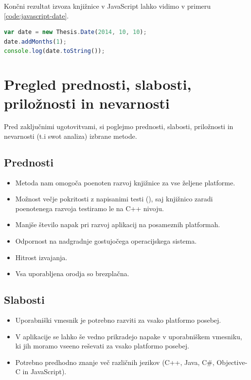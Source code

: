 Končni rezultat izvoza knjižnice v JavaScript lahko vidimo v primeru \ref{code:javascript-date}.

\begin{lstlisting}[caption={Primer uporabe izvoženega razreda \texttt{Date} v JavaScript.}, label=code:javascript-date, language=JavaScript]
var date = new Thesis.Date(2014, 10, 10);
date.addMonths(1);
console.log(date.toString());
\end{lstlisting}

\section{Pregled prednosti, slabosti, priložnosti in nevarnosti}

Pred zaključnimi ugotovitvami, si poglejmo prednosti, slabosti, priložnosti in nevarnosti (t.i \gls{swot} analiza) izbrane metode.


\subsection{Prednosti}

\begin{itemize}
  \item Metoda nam omogoča poenoten razvoj knjižnice za vse željene platforme.
  \item Možnost večje pokritosti z napisanimi testi (), saj knjižnico zaradi poenotenega razvoja testiramo le na C++ nivoju.
  \item Manjše število napak pri razvoj aplikacij na posameznih platformah.
  \item Odpornost na nadgradnje gostujočega operacijskega sistema.
  \item Hitrost izvajanja.
  \item Vsa uporabljena orodja so brezplačna.
\end{itemize}

\subsection{Slabosti}

\begin{itemize}
  \item Uporabniški vmesnik je potrebno razviti za vsako platformo posebej.
  \item V aplikacije se lahko še vedno prikradejo napake v uporabniškem vmesniku, ki jih moramo vseeno reševati za vsako platformo posebej.
  \item Potrebno predhodno znanje več različnih jezikov (C++, Java, C\#, Objective-C in JavaScript).
\end{itemize}

